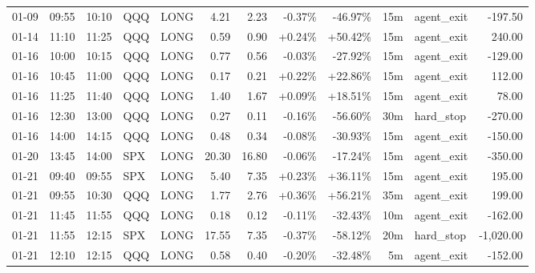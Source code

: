 \documentclass[11pt,a4paper]{article}
\begin{document}
\begin{center}
\begin{longtable}{>{\color{txtmain}}l l l l l r r r r r >{\color{txtmain}}l r}
01-09 & 09:55 & 10:10 & QQQ & LONG & 4.21 & 2.23 & \textcolor{lossred}{-0.37\%} & \textcolor{lossred}{-46.97\%} & 15m & agent\_exit & \textcolor{lossred}{-197.50} \\
01-14 & 11:10 & 11:25 & QQQ & LONG & 0.59 & 0.90 & \textcolor{wingreen}{+0.24\%} & \textcolor{wingreen}{+50.42\%} & 15m & agent\_exit & \textcolor{wingreen}{240.00} \\
01-16 & 10:00 & 10:15 & QQQ & LONG & 0.77 & 0.56 & \textcolor{lossred}{-0.03\%} & \textcolor{lossred}{-27.92\%} & 15m & agent\_exit & \textcolor{lossred}{-129.00} \\
01-16 & 10:45 & 11:00 & QQQ & LONG & 0.17 & 0.21 & \textcolor{wingreen}{+0.22\%} & \textcolor{wingreen}{+22.86\%} & 15m & agent\_exit & \textcolor{wingreen}{112.00} \\
01-16 & 11:25 & 11:40 & QQQ & LONG & 1.40 & 1.67 & \textcolor{wingreen}{+0.09\%} & \textcolor{wingreen}{+18.51\%} & 15m & agent\_exit & \textcolor{wingreen}{78.00} \\
01-16 & 12:30 & 13:00 & QQQ & LONG & 0.27 & 0.11 & \textcolor{lossred}{-0.16\%} & \textcolor{lossred}{-56.60\%} & 30m & hard\_stop & \textcolor{lossred}{-270.00} \\
01-16 & 14:00 & 14:15 & QQQ & LONG & 0.48 & 0.34 & \textcolor{lossred}{-0.08\%} & \textcolor{lossred}{-30.93\%} & 15m & agent\_exit & \textcolor{lossred}{-150.00} \\
01-20 & 13:45 & 14:00 & SPX & LONG & 20.30 & 16.80 & \textcolor{lossred}{-0.06\%} & \textcolor{lossred}{-17.24\%} & 15m & agent\_exit & \textcolor{lossred}{-350.00} \\
01-21 & 09:40 & 09:55 & SPX & LONG & 5.40 & 7.35 & \textcolor{wingreen}{+0.23\%} & \textcolor{wingreen}{+36.11\%} & 15m & agent\_exit & \textcolor{wingreen}{195.00} \\
01-21 & 09:55 & 10:30 & QQQ & LONG & 1.77 & 2.76 & \textcolor{wingreen}{+0.36\%} & \textcolor{wingreen}{+56.21\%} & 35m & agent\_exit & \textcolor{wingreen}{199.00} \\
01-21 & 11:45 & 11:55 & QQQ & LONG & 0.18 & 0.12 & \textcolor{lossred}{-0.11\%} & \textcolor{lossred}{-32.43\%} & 10m & agent\_exit & \textcolor{lossred}{-162.00} \\
01-21 & 11:55 & 12:15 & SPX & LONG & 17.55 & 7.35 & \textcolor{lossred}{-0.37\%} & \textcolor{lossred}{-58.12\%} & 20m & hard\_stop & \textcolor{lossred}{-1,020.00} \\
01-21 & 12:10 & 12:15 & QQQ & LONG & 0.58 & 0.40 & \textcolor{lossred}{-0.20\%} & \textcolor{lossred}{-32.48\%} & 5m & agent\_exit & \textcolor{lossred}{-152.00} \\

\end{longtable}
\end{center}
\end{document}
